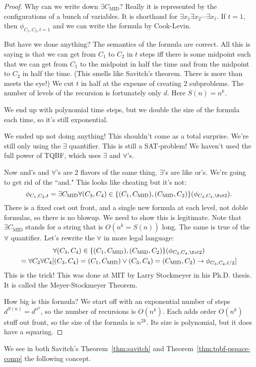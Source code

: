 \begin{proof}
Why can we write down $\exists C_{\text{MID}}$? Really it is  represented by the configurations of a bunch of variables.  It is shorthand for $\exists x_1\exists x_2\cdots \exists x_{\ell}$. 
If $t=1$, then $\phi_{C_1,C_2,t=1}$ and we can write the formula by Cook-Levin.  


But have we done anything? The semantics of the formula are correct. All this is saying is that we can get from $C_1$ to $C_2$ in $t$ steps iff there is some midpoint such that we can get from $C_1$ to the midpoint in half the time and from the midpoint to $C_2$ in half the time. (This smells like Savitch's theorem. There is more than meets the eye!) We cut $t$ in half at the expense of creating 2 subproblems. The number of levels of the recursion is fortunately only $d$. Here $S(n)=n^k$.

We end up with polynomial time steps, but we double the size of the formula each time, so it's still exponential.

We ended up not doing anything! This shouldn't come as a total surprise. We're still only using the $\exists$ quantifier. This is still a SAT-problem! We haven't used the full power of TQBF, which uses $\exists$ and $\forall$'s.

Now and's and $\forall$'s are 2 flavors of the same thing. $\exists$'s are like or's. We're going to get rid of the ``and." This looks like cheating but it's not:
\[
\phi_{C_1,C_2,t}=\exists C_{\text{MID}}\forall (C_3,C_4)\in \{
(C_1,C_{\text{MID}}), (C_{\text{MID}},C_2)
\}(\phi_{C_3,C_4,\fc t2}).
\]
There is a fixed cost out front, and a single new formula at each level, not doble formulas, so there is no blowup. We need to show this is legitimate. Note that $\exists C_{\text{MID}}$ stands for a string that is $O(n^k=S(n))$ long. The same is true of the $\forall$ quantifier. Let's rewrite the $\forall$ in more legal language:
\begin{multline*}
\forall (C_3,C_4)\in \{
(C_1,C_{\text{MID}}), (C_{\text{MID}},C_2)
\}(\phi_{C_3,C_4,\fc t2})\\
=
\forall C_3\forall C_4[(C_3,C_4)=(C_1,C_{\text{MID}})\vee (C_3,C_4)=(C_{\text{MID}},C_2)\to \phi_{C_3,C_4,t/2}]
\end{multline*}
This is the trick! This was done at MIT by Larry Stockmeyer in his Ph.D. thesis. It is called the Meyer-Stockmeyer Theorem. 

How big is this formula? We start off with an exponential number of steps $d^{S(n)}=d^{n^k}$, so the number of recursions is $O(n^k)$. Each adds order $O(n^k)$ stuff out front, so the size of the formula is $n^{2k}$. Its size is polynomial, but it does have a squaring. 
\end{proof}
We see in both Savitch's Theorem~\ref{thm:savitch} and Theorem~\ref{thm:tqbf-pspace-comp} the following concept.\\

